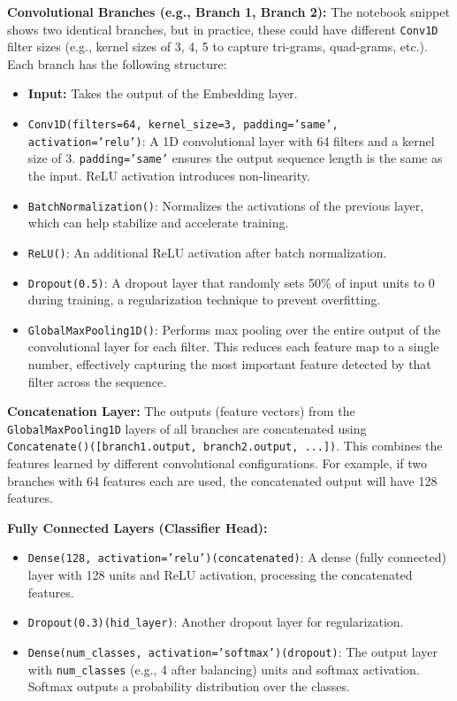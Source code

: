 \documentclass[twocolumn]{article}
\begin{document}
\vspace{0.5em}
\textbf{Convolutional Branches (e.g., Branch 1, Branch 2):}
The notebook snippet shows two identical branches, but in practice, these could have different \texttt{Conv1D} filter sizes (e.g., kernel sizes of 3, 4, 5 to capture tri-grams, quad-grams, etc.). Each branch has the following structure:
\begin{itemize}
    \item \textbf{Input:} Takes the output of the Embedding layer.
    \item \texttt{Conv1D(filters=64, kernel\_size=3, padding='same', activation='relu')}: A 1D convolutional layer with 64 filters and a kernel size of 3. \texttt{padding='same'} ensures the output sequence length is the same as the input. ReLU activation introduces non-linearity.
    \item \texttt{BatchNormalization()}: Normalizes the activations of the previous layer, which can help stabilize and accelerate training.
    \item \texttt{ReLU()}: An additional ReLU activation after batch normalization.
    \item \texttt{Dropout(0.5)}: A dropout layer that randomly sets 50\% of input units to 0 during training, a regularization technique to prevent overfitting.
    \item \texttt{GlobalMaxPooling1D()}: Performs max pooling over the entire output of the convolutional layer for each filter. This reduces each feature map to a single number, effectively capturing the most important feature detected by that filter across the sequence.
\end{itemize}

\vspace{0.5em}
\textbf{Concatenation Layer:}
The outputs (feature vectors) from the \texttt{GlobalMaxPooling1D} layers of all branches are concatenated using \texttt{Concatenate()([branch1.output, branch2.output, ...])}. This combines the features learned by different convolutional configurations. For example, if two branches with 64 features each are used, the concatenated output will have 128 features.

\vspace{0.5em}
\textbf{Fully Connected Layers (Classifier Head):}
\begin{itemize}
    \item \texttt{Dense(128, activation='relu')(concatenated)}: A dense (fully connected) layer with 128 units and ReLU activation, processing the concatenated features.
    \item \texttt{Dropout(0.3)(hid\_layer)}: Another dropout layer for regularization.
    \item \texttt{Dense(num\_classes, activation='softmax')(dropout)}: The output layer with \texttt{num\_classes} (e.g., 4 after balancing) units and softmax activation. Softmax outputs a probability distribution over the classes.
\end{itemize}
\end{document}
